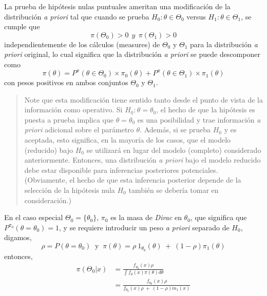 \documentclass[12pt,]{article}
\begin{document}
La prueba de hipótesis nulas puntuales ameritan una modificación de la
distribución \emph{a priori} tal que cuando se prueba
\(H_0:\theta\in\Theta_0\) versus \(H_1:\theta\in\Theta_1\), se cumple
que \[
\pi(\Theta_0)>0\ \ y \ \ \pi(\Theta_1)>0
\] independientemente de los cálculos (measures) de \(\Theta_0\) y
\(\Theta_1\) para la distribución \emph{a priori} original, lo cual
significa que la distribución \emph{a priori} se puede descomponer como
\[
\pi(\theta)=P^\pi(\theta\in\Theta_0)\times\pi_0(\theta)+P^\pi(\theta\in\Theta_1)\times\pi_1(\theta)
\] con pesos positivos en ambos conjuntos \(\Theta_0\) y \(\Theta_1\).

\begin{quote}
Note que esta modificación tiene sentido tanto desde el punto de vista
de la información como operativo. Si \(H_0:\theta=\theta_0\), el hecho
de que la hipótesis es puesta a prueba implica que \(\theta=\theta_0\)
es una posibilidad y trae información \emph{a priori} adicional sobre el
parámetro \(\theta\). Además, si se prueba \(H_0\) y es aceptada, esto
significa, en la mayoría de los casos, que el modelo (reducido) bajo
\(H_0\) se utilizará en lugar del modelo (completo) considerado
anteriormente. Entonces, una distribución \emph{a priori} bajo el modelo
reducido debe estar disponible para inferencias posteriores potenciales.
(Obviamente, el hecho de que esta inferencia posterior depende de la
selección de la hipótesis nula \(H_0\) también se debería tomar en
consideración.)
\end{quote}

En el caso especial \(\Theta_0=\{\theta_0\}\), \(\pi_0\) es la masa de
\emph{Dirac} en \(\theta_0\), que significa que
\(P^{\pi_0}(\theta=\theta_0)=1\), y se requiere introducir un peso
\emph{a priori} separado de \(H_0\), digamos, \[
\rho=P(\theta=\theta_0)\ \text{ y }\ \pi(\theta)=\rho\ 1_{\theta_0}(\theta)\ +\ (1-\rho)\pi_1(\theta) 
\] entonces, \[
\begin{array}{rl}
\displaystyle \pi(\Theta_0|x)&=\displaystyle \frac{f_{\theta_0}(x)\rho}{\displaystyle\int f_\theta(x)\pi(\theta)d\theta} \\
&=\displaystyle \frac{f_{\theta_0}(x)\rho}{f_{\theta_0}(x)\rho\ +\ (1-\rho)m_1(x)}
\end{array}
\]
\end{document}
